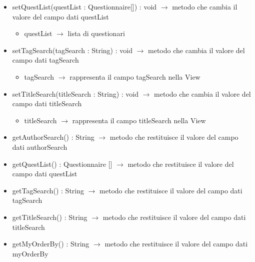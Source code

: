 \begin{description}
\begin{itemize}
	\item setQuestList(questList : Questionnaire[]) : void $\rightarrow$ metodo che cambia il valore del campo dati questList\begin{itemize}
		\item questList $\rightarrow$ lista di questionari
	\end{itemize}
	
	\item setTagSearch(tagSearch : String) : void $\rightarrow$ metodo che cambia il valore del campo dati tagSearch\begin{itemize}
		\item tagSearch $\rightarrow$ rappresenta il campo tagSearch nella View
	\end{itemize}
	
	\item setTitleSearch(titleSearch : String) : void $\rightarrow$ metodo che cambia il valore del campo dati titleSearch\begin{itemize}
		\item titleSearch $\rightarrow$ rappresenta il campo titleSearch nella View
	\end{itemize}
	
	\item getAuthorSearch() : String $\rightarrow$ metodo che restituisce il valore del campo dati authorSearch
	\item getQuestList() : Questionnaire [] $\rightarrow$ metodo che restituisce il valore del campo dati questList
	\item getTagSearch() : String $\rightarrow$ metodo che restituisce il valore del campo dati tagSearch
	\item getTitleSearch() : String $\rightarrow$ metodo che restituisce il valore del campo dati titleSearch
	\item getMyOrderBy() : String $\rightarrow$ metodo che restituisce il valore del campo dati myOrderBy
\end{itemize}

\end{description}

